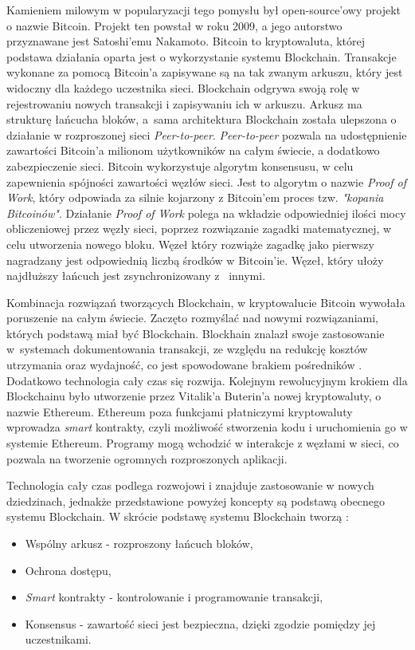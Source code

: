 \documentclass[a4paper,12pt]{book}
\begin{document}
Kamieniem milowym w popularyzacji tego pomysłu był open-source'owy projekt o nazwie Bitcoin. Projekt ten powstał w roku 2009, a jego autorstwo przyznawane jest Satoshi'emu Nakamoto. Bitcoin to kryptowaluta, której podstawa działania oparta jest o wykorzystanie systemu Blockchain. Transakcje wykonane za pomocą Bitcoin'a zapisywane są na tak zwanym arkuszu, który jest widoczny dla każdego uczestnika sieci. Blockchain odgrywa swoją rolę w rejestrowaniu nowych transakcji i zapisywaniu ich w arkuszu. Arkusz ma strukturę łańcucha bloków, a~sama architektura Blockchain została ulepszona o działanie w rozproszonej sieci \textit{Peer-to-peer}. \textit{Peer-to-peer} pozwala na udostępnienie zawartości Bitcoin'a milionom użytkowników na całym świecie, a dodatkowo zabezpieczenie sieci. Bitcoin wykorzystuje algorytm konsensusu, w celu zapewnienia spójności zawartości węzłów sieci. Jest to algorytm o nazwie \textit{Proof of Work}, który odpowiada za silnie kojarzony z Bitcoin'em proces tzw. \textit{"kopania Bitcoinów"}.
Działanie \textit{Proof of Work} polega na wkładzie odpowiedniej ilości mocy obliczeniowej przez węzły sieci, poprzez rozwiązanie zagadki matematycznej, w celu utworzenia nowego bloku. Węzeł który rozwiąże zagadkę jako pierwszy nagradzany jest odpowiednią liczbą środków w Bitcoin'ie. Węzeł, który ułoży najdłuższy łańcuch jest zsynchronizowany z~ innymi\cite{bitcoin}.

Kombinacja rozwiązań tworzących Blockchain, w kryptowalucie Bitcoin wywołała poruszenie na całym świecie. Zaczęto rozmyślać nad nowymi rozwiązaniami, których podstawą miał być Blockchain. Blockhain znalazł swoje zastosowanie w~systemach dokumentowania transakcji, ze względu na redukcję kosztów utrzymania oraz wydajność, co jest spowodowane brakiem pośredników \cite{business}. Dodatkowo technologia cały czas się rozwija. Kolejnym rewolucyjnym krokiem dla Blockchainu było utworzenie przez Vitalik'a Buterin'a nowej kryptowaluty, o nazwie Ethereum. Ethereum poza funkcjami płatniczymi kryptowaluty wprowadza \textit{smart} kontrakty, czyli możliwość stworzenia kodu i uruchomienia go w systemie Ethereum. Programy mogą wchodzić w interakcje z węzłami w sieci, co pozwala na tworzenie ogromnych rozproszonych aplikacji.

Technologia cały czas podlega rozwojowi i znajduje zastosowanie w nowych dziedzinach, jednakże przedstawione powyżej koncepty są podstawą obecnego systemu Blockchain. W skrócie podstawę systemu Blockchain tworzą \cite{business}:
\begin{itemize}
	\item Wspólny arkusz - rozproszony łańcuch bloków,
	\item Ochrona dostępu,
	\item \textit{Smart} kontrakty - kontrolowanie i programowanie transakcji,
	\item Konsensus - zawartość sieci jest bezpieczna, dzięki zgodzie pomiędzy jej uczestnikami.
\end{itemize}
\end{document}
